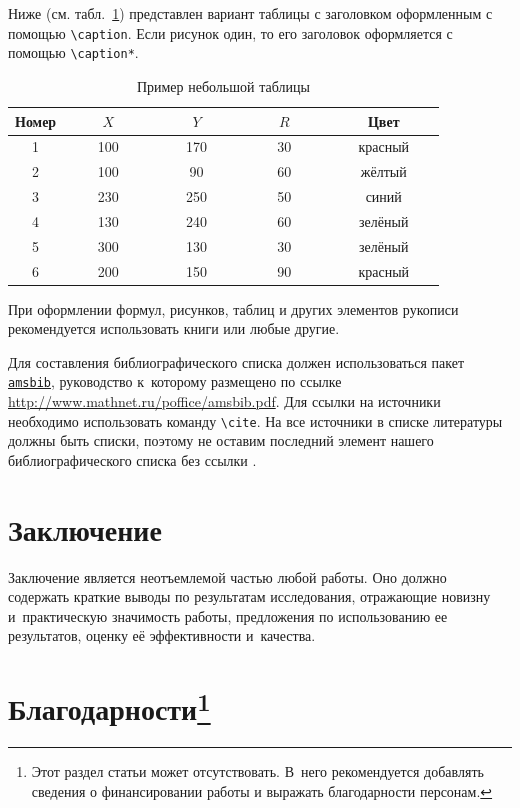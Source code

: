 \documentclass[10pt,twoside,book,a5paper]{ncc}
\begin{document}
Ниже (см. табл.~\ref{sampletable}) представлен вариант таблицы с заголовком оформленным с помощью \verb"\caption". 
Если рисунок один, то его заголовок оформляется с помощью \verb"\caption*".

\begin{table}[ht!]
\centering\small
\caption{Пример небольшой таблицы}
\label{sampletable}
\begin{tabular}{|c|c|c|c|c|}
\hline
Номер &~~~~$X$~~~~ &~~~~$Y$~~~~&~~~~$R$~~~~&~~~~Цвет~~~~\\
\hline
\rule{0mm}{12pt}%
1 &	100  &	170 & 30 & красный\\
2 &	100  &	90	& 60 & жёлтый\\
3 &	230  &	250	& 50 & синий\\
4 &	130  &	240 & 60 & зелёный\\
5 & 300  &	130 & 30 & зелёный\\
6 &	200  &	150	& 90 & красный\\
\hline
\end{tabular}
\end{table}

При оформлении формул, рисунков, таблиц и других элементов рукописи рекомендуется использовать книги \cite{latex:book1, latex:book2, latex:book3} или любые другие.


Для составления библиографического списка должен использоваться пакет \href{http://www.mathnet.ru/poffice/amsbibpackage.phtml?wshow=amsbibpackage&option_lang=rus}{\texttt{amsbib}}, руководство к~которому размещено по ссылке \url{http://www.mathnet.ru/poffice/amsbib.pdf}.
Для ссылки на источники необходимо использовать команду \verb"\cite".
На все источники в списке литературы должны быть списки, поэтому не оставим последний элемент нашего библиографического списка без ссылки  \cite{ZhiIza09}.


\section*{Заключение}

Заключение является неотъемлемой частью любой работы. 
Оно должно содержать краткие выводы по результатам исследования, отражающие новизну и~практическую значимость работы, предложения по использованию ее результатов, оценку её эффективности и~качества.

\section*{Благодарности\protect\footnote{Этот раздел статьи может отсутствовать. 
В~него рекомендуется добавлять сведения о финансировании работы и выражать благодарности персонам.}}
\end{document}
